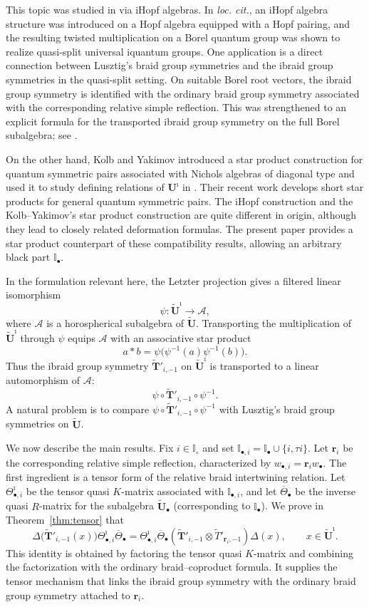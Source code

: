 \documentclass[a4paper,reqno,12pt]{amsart}
\numberwithin{equation}{section}
\theoremstyle{definition}
\theoremstyle{plain}
\theoremstyle{definition}
\def\I{\mathbb I}
\def\bI{\I_\bullet}
\def\wI{\I_\circ}
\def\bIi{\I_{\bullet,i}}
\def\br{\mathbf r}
\def\tU{\widetilde{\mathbf U}}
\def\tUi{\widetilde{\mathbf U}^{\imath}}
\def\tTD{\widetilde T}
\def\tTT{\widetilde{\mathbf T}}
\def\cA{\mathcal A}
\newcommand{\tTa}[1]{\tTT'_{#1,-1}}
\begin{document}
This topic was studied in \cite{CLPRW25} via iHopf algebras.  In \emph{loc. cit.}, an $\mathrm i$Hopf algebra structure was introduced on a Hopf algebra equipped with a Hopf pairing, and the resulting twisted multiplication on a Borel quantum group was shown to realize quasi-split universal $\mathrm i$quantum groups.  One application is a direct connection between Lusztig's braid group symmetries and the ibraid  group symmetries in the quasi-split setting.  On suitable Borel root vectors, the ibraid group symmetry is identified with the ordinary braid group symmetry associated with the corresponding relative simple reflection.
This was strengthened to an explicit formula for the transported ibraid group symmetry on the full Borel subalgebra; see \cite[Theorem 3.11]{CLPRW26}.



On the other hand, 
Kolb and Yakimov introduced a star product construction for quantum symmetric pairs associated with Nichols algebras of diagonal type \cite{KY20} and used it to study defining relations of $\mathbf{U}^\imath$ in \cite{KY21}.  Their recent work \cite{KY26} develops short star products for general quantum symmetric pairs. The $\mathrm i$Hopf construction and the Kolb--Yakimov's star product construction are quite different in origin, although they lead to closely related deformation formulas.  The present paper provides a star product counterpart of these compatibility results, allowing an arbitrary black part $\bI$.

\iffalse
In the formulation relevant here, the Letzter projection gives a filtered linear isomorphism
\[
   \psi:\tUi\longrightarrow\cA,
\]
where $\cA$ is a horospherical subalgebra of $\tU$.  Transporting the multiplication of $\tUi$ through $\psi$ equips $\cA$ with an associative star product
\[
   a\ast b=\psi\bigl(\psi^{-1}(a)\psi^{-1}(b)\bigr).
\]
Thus the ibraid group symmetry $\tTa{i}$ on $\tUi$ is transported to a linear automorphism of $\cA$:
\[
   \psi\circ\tTa{i}\circ\psi^{-1}.
\]
 A natural problem is to compare $\psi\circ\tTa{i}\circ\psi^{-1}$ with Lusztig's braid group symmetries on $\tU$.

We now describe the main results.  Fix $i\in\wI$ and set $\bIi=\bI\cup\{i,\tau i\}$.  Let $\br_i$ be the corresponding relative simple reflection, characterized by $w_{\bullet,i}=\br_iw_\bullet$.  The first ingredient is a tensor form of the relative braid intertwining relation.  Let $\Theta_{\bullet,i}^{\imath}$ be the tensor quasi $K$-matrix associated with $\bIi$, and let $\overline\Theta_\bullet$ be the inverse quasi $R$-matrix for the subalgebra $\tU_\bullet$ (corresponding to $\I_\bullet$).  We prove in Theorem~\ref{thm:tensor} that
\begin{equation*}
\Delta\bigl(\tTa{i}(x)\bigr)
\Theta_{\bullet,i}^{\imath}\overline\Theta_\bullet
=
\Theta_{\bullet,i}^{\imath}\overline\Theta_\bullet
(\tTa{i}\otimes\tTD'_{\br_i,-1})\Delta(x),
\qquad x\in\tUi.
\end{equation*}
This identity is obtained by factoring the tensor quasi $K$-matrix and combining the factorization with the ordinary braid--coproduct formula.  It supplies the tensor mechanism that links the ibraid group symmetry with the ordinary braid group symmetry attached to $\br_i$.
\end{document}

